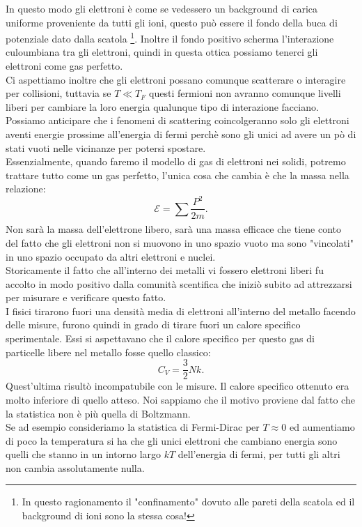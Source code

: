In questo modo gli elettroni è come se vedessero un background di carica uniforme proveniente da tutti gli ioni, questo può essere il fondo della buca di potenziale dato dalla scatola \footnote{In questo ragionamento il "confinamento" dovuto alle pareti della scatola ed il background di ioni sono la stessa cosa!}. Inoltre il fondo positivo scherma l'interazione culoumbiana tra gli elettroni, quindi in questa ottica possiamo tenerci gli elettroni come gas perfetto.\\
Ci aspettiamo inoltre che gli elettroni possano comunque scatterare o interagire per collisioni, tuttavia se $T \ll T_{F}$ questi fermioni non avranno comunque livelli liberi per cambiare la loro energia qualunque tipo di interazione facciano. \\
Possiamo anticipare che i fenomeni di scattering coincolgeranno solo gli elettroni aventi energie prossime all'energia di fermi perchè sono gli unici ad avere un pò di stati vuoti nelle vicinanze per potersi spostare.\\
Essenzialmente, quando faremo il modello di gas di elettroni nei solidi, potremo trattare tutto come un gas perfetto, l'unica cosa che cambia è che la massa nella relazione:
\[
	\mathcal{E} = \sum_{}^{} \frac{P^2}{2m}
.\] 
Non sarà la massa dell'elettrone libero, sarà una massa efficace che tiene conto del fatto che gli elettroni non si muovono in uno spazio vuoto ma sono "vincolati" in uno spazio occupato da altri elettroni e nuclei.\\
Storicamente il fatto che all'interno dei metalli vi fossero elettroni liberi fu accolto in modo positivo dalla comunità scentifica che iniziò subito ad attrezzarsi per misurare e verificare questo fatto.\\ 
I fisici tirarono fuori una densità media di elettroni all'interno del metallo facendo delle misure, furono quindi in grado di tirare fuori un calore specifico sperimentale. Essi si aspettavano che il calore specifico per questo gas di particelle libere nel metallo fosse quello classico: 
\[
	C_{V}= \frac{3}{2}Nk
.\] 
Quest'ultima risultò incompatubile con le misure. Il calore specifico ottenuto era molto inferiore di quello atteso. Noi sappiamo che il motivo proviene dal fatto che la statistica non è più quella di Boltzmann. \\
Se ad esempio consideriamo la statistica di Fermi-Dirac per $T \approx 0$ ed aumentiamo di poco la temperatura si ha che gli unici elettroni che cambiano energia sono quelli che stanno in un intorno largo $kT$ dell'energia di fermi, per tutti gli altri non cambia assolutamente nulla.\\ 
